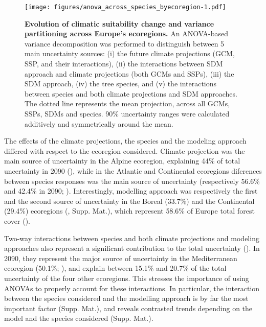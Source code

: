 \documentclass[letterpaper,8pt]{article}  %
\begin{document}
\begin{doublespacing}
\begin{linenumbers}
\begin{figure}[H]
\vspace*{0cm}
\centering
\texttt{[image: figures/anova\_across\_species\_byecoregion-1.pdf]}
\caption{\textbf{Evolution of climatic suitability change and variance partitioning across Europe's ecoregions.} An ANOVA-based variance decomposition was performed to distinguish between 5 main uncertainty sources: (i) the future climate projections (GCM, SSP, and their interactions), (ii) the interactions between SDM approach and climate projections (both GCMs and SSPs), (iii) the SDM approach, (iv) the tree species, and (v) the interactions between species and both climate projections and SDM approaches. The dotted line represents the mean projection, across all GCMs, SSPs, SDMs and species. 90\% uncertainty ranges were calculated additively and symmetrically around the mean.}
\label{fig:anovaecoregions}
\vspace*{0cm}
\end{figure}

The effects of the climate projections, the species  and the modeling approach differed with respect to the ecoregion considered. Climate projection was the main source of uncertainty in the Alpine ecoregion, explaining 44\% of total uncertainty in 2090 (), while in the Atlantic and Continental ecoregions diferences between species responses was the main source of uncertainty (respectively 56.6\% and 42.4\% in 2090; ). Interestingly, modelling approach was respectively the first and the second source of uncertainty in the Boreal (33.7\%) and the Continental (29.4\%) ecoregions (, Supp. Mat.), which represent 58.6\% of Europe total forest cover ().

Two-way interactions between species and both climate projections and modeling approaches also represent a significant contribution to the total uncertainty (). In 2090, they represent the major source of uncertainty in the Mediterranean ecoregion  (50.1\%; ), and explain between 15.1\% and 20.7\% of the total uncertainty of the four other ecoregions. This stresses the importance of using ANOVAs to properly account for these interactions. In particular, the interaction between the species considered and the modelling approach is by far the most important factor (Supp. Mat.), and reveals contrasted trends depending on the model and the species considered (Supp. Mat.). 


\end{linenumbers}
\end{doublespacing}
\end{document}
